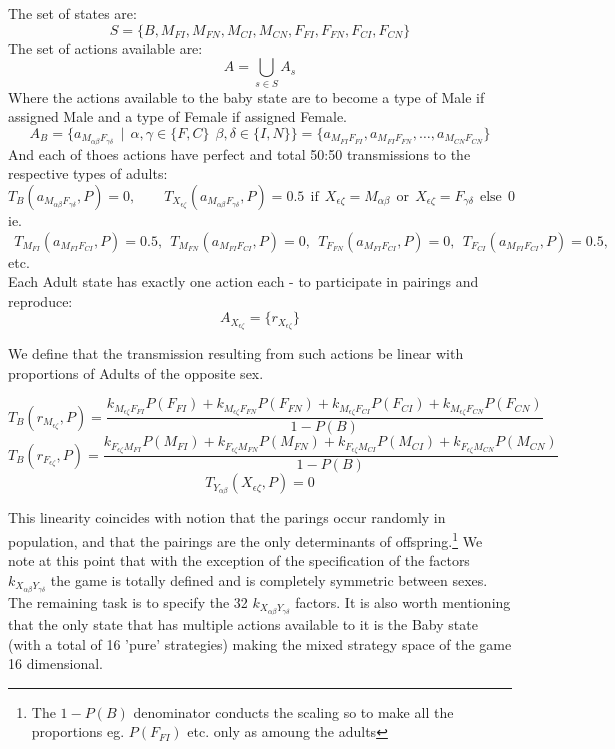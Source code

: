 \documentclass[journal,article,accept,oneauthors,pdftex,10pt,a4paper]{mdpi}
\begin{document}
The set of states are: $$S = \{B, M_{FI}, M_{FN}, M_{CI}, M_{CN}, F_{FI}, F_{FN}, F_{CI}, F_{CN}\}$$
The set of actions available are: $$A = \bigcup_{s \in S} A_s$$
Where the actions available to the baby state are to become a type of Male if assigned Male and a type of Female if assigned Female.
$$A_B = \{a_{M_{\alpha\beta}F_{\gamma\delta}} ~~|~~ \alpha,\gamma\in\{{F,C}\}~~\beta,\delta\in\{{I,N}\}\} = \{a_{M_{FI}F_{FI}}, a_{M_{FI}F_{FN}}, \dots, a_{M_{CN}F_{CN}}\}$$
And each of thoes actions have perfect and total 50:50 transmissions to the respective types of adults:
$$T_{B}(a_{M_{\alpha\beta}F_{\gamma\delta}}, P)=0,~~~~~~~~~ T_{X_{\epsilon\zeta}}(a_{M_{\alpha\beta}F_{\gamma\delta}}, P) = 0.5~~\text{if}~~X_{\epsilon\zeta}=M_{\alpha\beta}~~\text{or}~~X_{\epsilon\zeta}=F_{\gamma\delta}~~\text{else}~~0 $$
ie.$~~ T_{M_{FI}}(a_{M_{FI}F_{CI}}, P) = 0.5,~~ T_{M_{FN}}(a_{M_{FI}F_{CI}}, P) = 0,~~ T_{F_{FN}}(a_{M_{FI}F_{CI}}, P) = 0,~~ T_{F_{CI}}(a_{M_{FI}F_{CI}}, P) = 0.5,~~$etc.\\

Each Adult state has exactly one action each - to participate in pairings and reproduce:
$$A_{X_{\epsilon\zeta}} = \{ r_{X_{\epsilon\zeta}} \}$$

We define that the transmission resulting from such actions be linear with proportions of Adults of the opposite sex.

$$T_{B}(r_{M_{\epsilon\zeta}},P) = \frac{k_{M_{\epsilon\zeta}F_{FI}} P(F_{FI}) + k_{M_{\epsilon\zeta}F_{FN}} P(F_{FN}) + k_{M_{\epsilon\zeta}F_{CI}} P(F_{CI}) + k_{M_{\epsilon\zeta}F_{CN}} P(F_{CN})}{1-P(B)}$$
$$T_{B}(r_{F_{\epsilon\zeta}},P) = \frac{k_{F_{\epsilon\zeta}M_{FI}} P(M_{FI}) + k_{F_{\epsilon\zeta}M_{FN}} P(M_{FN}) + k_{F_{\epsilon\zeta}M_{CI}} P(M_{CI}) + k_{F_{\epsilon\zeta}M_{CN}} P(M_{CN})}{1-P(B)}$$
$$T_{Y_{\alpha\beta}}(X_{\epsilon\zeta},P)=0$$

This linearity coincides with notion that the parings occur randomly in population, and that the pairings are the only determinants of offspring.\footnote{The $1-P(B)$ denominator conducts the scaling so to make all the proportions eg. $P(F_{FI})$ etc. only as amoung the adults}
We note at this point that with the exception of the specification of the factors $k_{X_{\alpha\beta}Y_{\gamma\delta}}$ the game is totally defined and is completely symmetric between sexes.
The remaining task is to specify the 32 $k_{X_{\alpha\beta}Y_{\gamma\delta}}$ factors.
It is also worth mentioning that the only state that has multiple actions available to it is the Baby state (with a total of 16 'pure' strategies) making the mixed strategy space of the game 16 dimensional.
\end{document}
